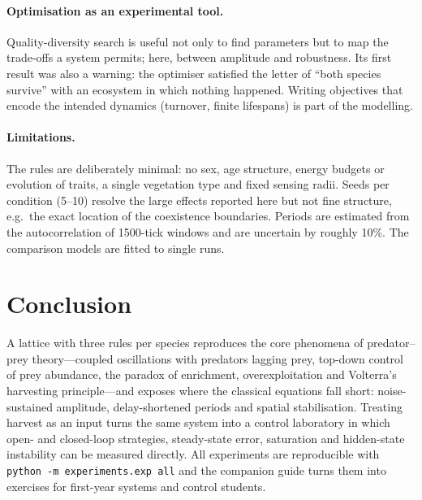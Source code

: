 \paragraph{Optimisation as an experimental tool.} Quality-diversity search is useful not only to find
parameters but to map the trade-offs a system permits; here, between amplitude and robustness. Its
first result was also a warning: the optimiser satisfied the letter of ``both species survive'' with an
ecosystem in which nothing happened. Writing objectives that encode the intended dynamics (turnover,
finite lifespans) is part of the modelling.

\paragraph{Limitations.} The rules are deliberately minimal: no sex, age structure, energy budgets or
evolution of traits, a single vegetation type and fixed sensing radii. Seeds per condition (5--10) resolve
the large effects reported here but not fine structure, e.g.\ the exact location of the coexistence
boundaries. Periods are estimated from the autocorrelation of 1500-tick windows and are uncertain by roughly
10\%. The comparison models are fitted to single runs.

\section{Conclusion}
A lattice with three rules per species reproduces the core phenomena of predator--prey theory---coupled
oscillations with predators lagging prey, top-down control of prey abundance, the paradox of enrichment,
overexploitation and Volterra's harvesting principle---and exposes where the classical equations fall short:
noise-sustained amplitude, delay-shortened periods and spatial stabilisation. Treating harvest as an input
turns the same system into a control laboratory in which open- and closed-loop strategies, steady-state error,
saturation and hidden-state instability can be measured directly. All experiments are reproducible with
\texttt{python -m experiments.exp all} and the companion guide turns them into exercises for first-year
systems and control students.
